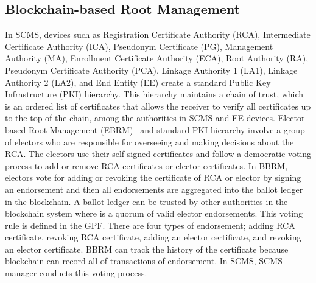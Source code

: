 \subsection{Blockchain-based Root Management}
\label{ebrm}
In  SCMS, devices such as Registration Certificate Authority (RCA), Intermediate Certificate Authority (ICA), Pseudonym Certificate (PG), Management Authority (MA), Enrollment Certificate Authority (ECA), Root Authority (RA), Pseudonym Certificate Authority (PCA), Linkage Authority 1 (LA1), Linkage Authority 2 (LA2), and End Entity (EE) create a standard Public Key Infrastructure (PKI) hierarchy. This hierarchy maintains a chain of trust, which is an ordered list of certificates that allows the receiver to verify all certificates up to the top of the chain, among the authorities in SCMS and EE devices. Elector-based Root Management (EBRM)~\cite{sarker2021blockchain} and standard PKI hierarchy involve a group of electors who are responsible for overseeing and making decisions about the RCA. The electors use their self-signed certificates and follow a democratic voting process to add or remove RCA certificates or elector certificates. 
In BBRM, electors vote for adding or revoking the certificate of RCA or elector by signing an endorsement and then all endorsements are aggregated into the ballot ledger in the blockchain. A ballot ledger can be trusted by other authorities in the blockchain system where is a quorum of valid elector endorsements. This voting rule is defined in the GPF. There are four types of endorsement; adding RCA certificate, revoking RCA certificate, adding an elector certificate, and revoking an elector certificate. BBRM can track the history of the certificate because blockchain can record all of transactions of endorsement. In SCMS, SCMS manager conducts this voting process. 



